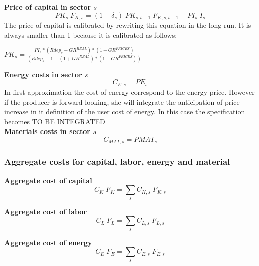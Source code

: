 \documentclass[12pt]{article}
\numberwithin{equation}{section}
\begin{document}
\noindent\textbf{Price of capital in sector $s$} \\
\begin{dmath}
PK_{s} \; F_{K, s} = \left( 1 - \delta_{s} \right) \; PK_{s, t-1} \; F_{K, s, t-1} + PI_{s} \; I_{s}
\end{dmath}
The price of capital is calibrated by rewriting this equation in the long run. It is always smaller than 1 because it is calibrated as follows: \begin{center} $PK_{s} = \frac{PI_{s}*(Rdep_{s}+GR^{REAL})*(1+GR^{PRICES})}{(Rdep_{s}-1+(1+GR^{REAL})*(1+GR^{PRICES}))}$ \end{center}

\noindent\textbf{Energy costs in sector $s$} \\
\begin{dmath}
C_{E, s} = PE_{s}
\end{dmath}
In first approximation the cost of energy correspond to the energy price. However if the producer is forward looking, she will integrate the anticipation of price increase in it definition of the user cost of energy. In this case the specification becomes TO BE INTEGRATED \\

\noindent\textbf{Materials costs in sector $s$} \\
\begin{dmath}
C_{MAT, s} = PMAT_{s}
\end{dmath}



\subsubsection{Aggregate costs for capital, labor, energy and material}


\noindent\textbf{Aggregate cost of capital} \\
\begin{dmath}
C_{K} \; F_{K} = \sum_{s} C_{K, s} \; F_{K, s}
\end{dmath}

\noindent\textbf{Aggregate cost of labor} \\
\begin{dmath}
C_{L} \; F_{L} = \sum_{s} C_{L, s} \; F_{L, s}
\end{dmath}

\noindent\textbf{Aggregate cost of energy} \\
\begin{dmath}
C_{E} \; F_{E} = \sum_{s} C_{E, s} \; F_{E, s}
\end{dmath}
\end{document}
